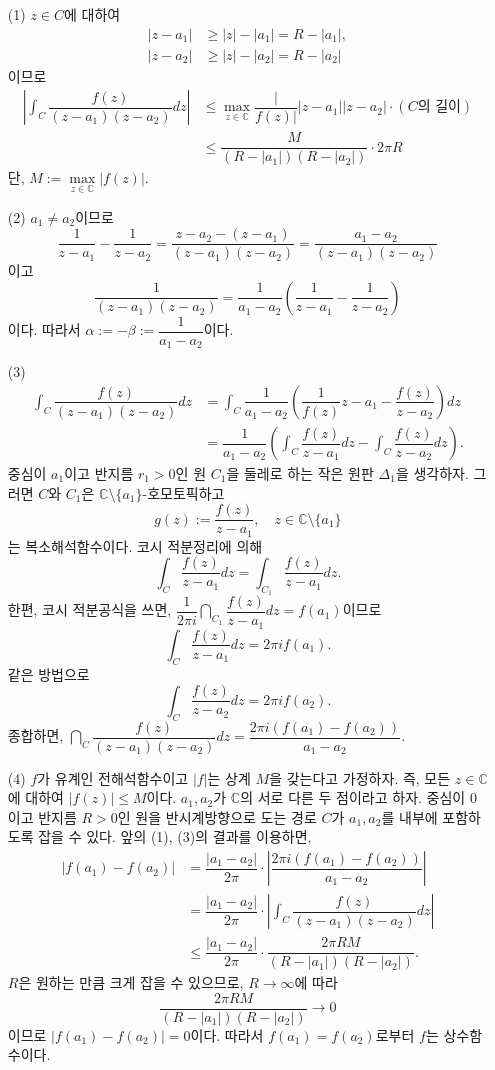 \begin{itemize}
\item[(1)] $z\in C$에 대하여
\begin{align*}
|z-a_1| &\ge |z| - |a_1| = R - |a_1|, \\
|z-a_2| &\ge |z| - |a_2| = R - |a_2|
\end{align*}
이므로 
\begin{align*}
\left| \int_C \dfrac{f(z)}{(z-a_1)(z-a_2)} dz \right|
&\le \max_{z\in\mathbb C} \dfrac|{f(z)|}{|z-a_1| |z-a_2|} \cdot
(C\text{의 길이}) \\
&\le \dfrac{M}{(R-|a_1|)(R-|a_2|)}\cdot 2\pi R
\end{align*}
단, $M:= \max\limits_{z\in\mathbb C}|f(z)|$.

\item[(2)]  $a_1\ne a_2$이므로
\[
\dfrac1{z-a_1} - \dfrac1{z-a_2} = \dfrac{z-a_2 -(z-a_1)}{(z-a_1)(z-a_2)}
= \dfrac{a_1 -a_2}{(z-a_1)(z-a_2)}
\]
이고
\[
\dfrac1{(z-a_1)(z-a_2)} = \dfrac1{a_1 - a_2} \left(
\dfrac1{z-a_1} - \dfrac1{z-a_2} \right)
\]
이다. 따라서 $\alpha:=-\beta:= \dfrac1{a_1-a_2}$이다.

\item[(3)] 
\begin{align*}
\int_C \dfrac{f(z)}{(z-a_1)(z-a_2)} dz
&= \int_C \dfrac1{a_1-a_2}\left(
\dfrac1{f(z)}{z-a_1} - \dfrac{f(z)}{z-a_2} \right) dz \\
&= \dfrac1{a_1-a_2} \left( \int_C \dfrac{f(z)}{z-a_1}dz - \int_C \dfrac{f(z)}{z-a_2}dz \right).
\end{align*}
중심이 $a_1$이고 반지름 $r_1>0$인 원 $C_1$을 둘레로 하는 작은 원판 $ \Delta_1$을 생각하자.
그러면 $C$와 $C_1$은 $\mathbb C \setminus \{a_1\}$-호모토픽하고
\[
g(z):= \dfrac{f(z)}{z-a_1}, \quad z\in \mathbb C\setminus \{a_1\}
\]
는 복소해석함수이다. 코시 적분정리에 의해
\[
\int_C \dfrac{f(z)}{z-a_1}dz = \int_{C_1} \dfrac{f(z)}{z-a_1}dz.
\]
한편, 코시 적분공식을 쓰면,
$\dfrac1{2\pi i} \dint_{C_1} \dfrac{f(z)}{z-a_1}dz = f(a_1)$이므로
\[
\int_C \dfrac{f(z)}{z-a_1}dz = 2\pi i f(a_1).
\]
같은 방법으로
\[
\int_C \dfrac{f(z)}{z-a_2}dz = 2\pi i f(a_2).
\]
종합하면, $\dint_C \dfrac{f(z)}{(z-a_1)(z-a_2)} dz
= \dfrac{2\pi i(f(a_1) - f(a_2))}{a_1 - a_2}$.
\item[(4)]
$f$가 유계인 전해석함수이고 $|f|$는 상계 $M$을 갖는다고 가정하자.
즉, 모든 $z\in\mathbb C$에 대하여 $|f(z)| \le M$이다.
$a_1, a_2$가 $\mathbb C$의 서로 다른  두 점이라고 하자.
중심이 $0$이고 반지름 $R>0$인 원을 반시계방향으로 도는 경로 $C$가
$a_1, a_2$를 내부에 포함하도록 잡을 수 있다.
앞의 (1), (3)의 결과를 이용하면,
\begin{align*}
|f(a_1) - f(a_2)|
&= \dfrac{|a_1 - a_2|}{2\pi} \cdot \left| \dfrac{2\pi i(f(a_1) - f(a_2))}{a_1 - a_2} \right| \\
&= \dfrac{|a_1 - a_2|}{2\pi} \cdot \left| \int_C \dfrac{f(z)}{(z-a_1)(z-a_2)}dz \right| \\
&\le \dfrac{|a_1 - a_2|}{2\pi} \cdot \dfrac{2\pi RM}{(R-|a_1|)(R-|a_2|)}.
\end{align*}
$R$은 원하는 만큼 크게 잡을 수 있으므로, 
$R\to\infty$에 따라
\[
\dfrac{2\pi RM}{(R-|a_1|)(R-|a_2|)} \to 0
\]
이므로 $|f(a_1) - f(a_2)| =0$이다.
따라서 $f(a_1) = f(a_2)$로부터 $f$는 상수함수이다.
\end{itemize}










 